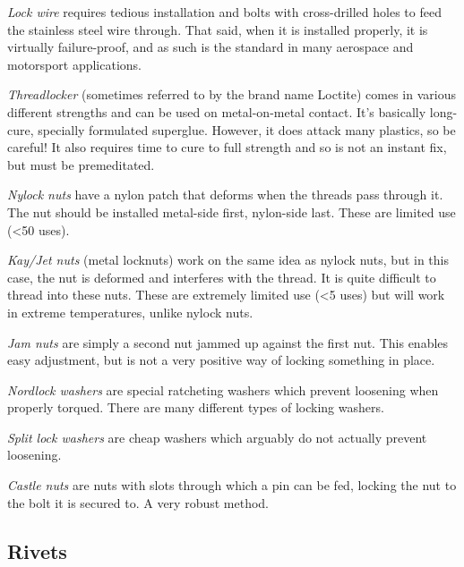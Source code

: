 \documentclass[10pt,letterpaper]{book}
\begin{document}
	\begin{asparaenum}[a)]
		\item \textit{Lock wire} requires tedious installation and bolts with cross-drilled holes to feed the stainless steel wire through. That said, when it is installed properly, it is virtually failure-proof, and as such is the standard in many aerospace and motorsport applications. 
		\item \textit{Threadlocker} (sometimes referred to by the brand name Loctite) comes in various different strengths and can be used on metal-on-metal contact. It's basically long-cure, specially formulated superglue. However, it does attack many plastics, so be careful! It also requires time to cure to full strength and so is not an instant fix, but must be premeditated.
		\item \textit{Nylock nuts} have a nylon patch that deforms when the threads pass through it. The nut should be installed metal-side first, nylon-side last. These are limited use (<50 uses).
		\item \textit{Kay/Jet nuts} (metal locknuts) work on the same idea as nylock nuts, but in this case, the nut is deformed and interferes with the thread. It is quite difficult to thread into these nuts. These are extremely limited use (<5 uses) but will work in extreme temperatures, unlike nylock nuts.
		\item \textit{Jam nuts} are simply a second nut jammed up against the first nut. This enables easy adjustment, but is not a very positive way of locking something in place.
		\item \textit{Nordlock washers} are special ratcheting washers which prevent loosening when properly torqued. There are many different types of locking washers.
		\item \textit{Split lock washers} are cheap washers which arguably do not actually prevent loosening.
		\item \textit{Castle nuts} are nuts with slots through which a pin can be fed, locking the nut to the bolt it is secured to. A very robust method.
	\end{asparaenum}
	
	\subsection{Rivets}
	
\end{document}
